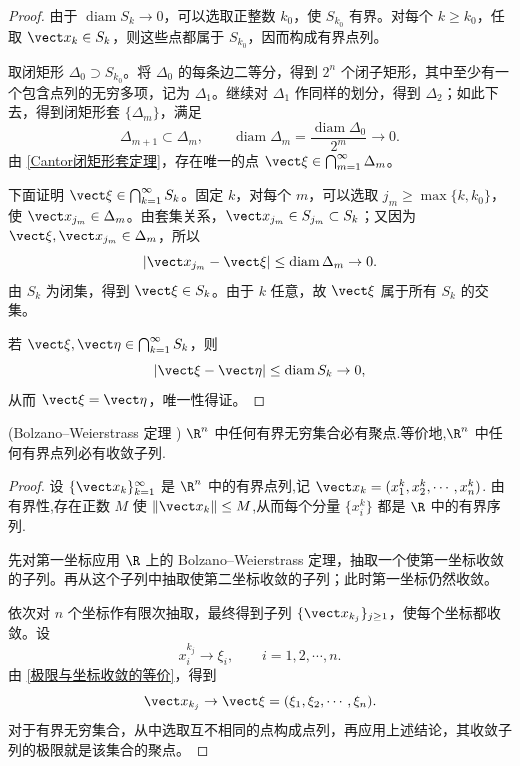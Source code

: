 \begin{proof}
由于 $\operatorname{diam}S_k\to0$，可以选取正整数 $k_0$，使 $S_{k_0}$ 有界。对每个 $k\geq k_0$，任取 $\vect x_k\in S_k$，则这些点都属于 $S_{k_0}$，因而构成有界点列。

取闭矩形 $\Delta_0\supset S_{k_0}$。将 $\Delta_0$ 的每条边二等分，得到 $2^n$ 个闭子矩形，其中至少有一个包含点列的无穷多项，记为 $\Delta_1$。继续对 $\Delta_1$ 作同样的划分，得到 $\Delta_2$；如此下去，得到闭矩形套 $\{\Delta_m\}$，满足
\[
\Delta_{m+1}\subset\Delta_m,\qquad
\operatorname{diam}\Delta_m=\frac{\operatorname{diam}\Delta_0}{2^m}\to0.
\]
由 \ref{Cantor闭矩形套定理}，存在唯一的点 $\vect\xi\in\bigcap_{m=1}^{\infty}\Delta_m$。

下面证明 $\vect\xi\in\bigcap_{k=1}^{\infty}S_k$。固定 $k$，对每个 $m$，可以选取 $j_m\geq\max\{k,k_0\}$，使 $\vect x_{j_m}\in\Delta_m$。由套集关系，$\vect x_{j_m}\in S_{j_m}\subset S_k$；又因为 $\vect\xi,\vect x_{j_m}\in\Delta_m$，所以
\[
|\vect x_{j_m}-\vect\xi|\leq\operatorname{diam}\Delta_m\to0.
\]
由 $S_k$ 为闭集，得到 $\vect\xi\in S_k$。由于 $k$ 任意，故 $\vect\xi$ 属于所有 $S_k$ 的交集。

若 $\vect\xi,\vect\eta\in\bigcap_{k=1}^{\infty}S_k$，则
\[
|\vect\xi-\vect\eta|\leq\operatorname{diam}S_k\to0,
\]
从而 $\vect\xi=\vect\eta$，唯一性得证。
\end{proof}

\begin{theorem}\label{Bolzano-Weierstrass定理}(Bolzano--Weierstrass 定理 )
$\R^n$ 中任何有界无穷集合必有聚点.等价地,$\R^n$ 中任何有界点列必有收敛子列.
\end{theorem}

\begin{proof}
设 $\{\vect x_k\}_{k=1}^\infty$ 是 $\R^n$ 中的有界点列,记 $\vect x_k=(x_1^k,x_2^k,\cdots,x_n^k)$. 由有界性,存在正数 $M$ 使 $\|\vect x_k\|\leq M$,从而每个分量 $\{x_i^k\}$ 都是 $\R$ 中的有界序列.

先对第一坐标应用 $\R$ 上的 Bolzano–Weierstrass 定理，抽取一个使第一坐标收敛的子列。再从这个子列中抽取使第二坐标收敛的子列；此时第一坐标仍然收敛。

依次对 $n$ 个坐标作有限次抽取，最终得到子列 $\{\vect x_{k_j}\}_{j\geq1}$，使每个坐标都收敛。设
\[
x_i^{k_j}\to\xi_i,\qquad i=1,2,\cdots,n.
\]
由 \ref{极限与坐标收敛的等价}，得到
\[
\vect x_{k_j}\to\vect\xi=(\xi_1,\xi_2,\cdots,\xi_n).
\]
对于有界无穷集合，从中选取互不相同的点构成点列，再应用上述结论，其收敛子列的极限就是该集合的聚点。
\end{proof}


